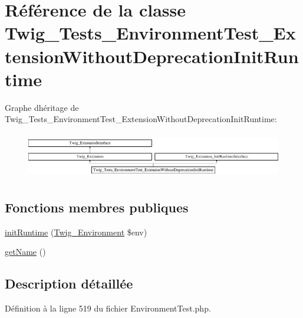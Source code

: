 \hypertarget{class_twig___tests___environment_test___extension_without_deprecation_init_runtime}{}\section{Référence de la classe Twig\+\_\+\+Tests\+\_\+\+Environment\+Test\+\_\+\+Extension\+Without\+Deprecation\+Init\+Runtime}
\label{class_twig___tests___environment_test___extension_without_deprecation_init_runtime}
Graphe d\textquotesingle{}héritage de Twig\+\_\+\+Tests\+\_\+\+Environment\+Test\+\_\+\+Extension\+Without\+Deprecation\+Init\+Runtime\+:\begin{figure}[H]
\begin{center}
\leavevmode
\includegraphics[height=2.033898cm]{class_twig___tests___environment_test___extension_without_deprecation_init_runtime}
\end{center}
\end{figure}
\subsection*{Fonctions membres publiques}
\begin{DoxyCompactItemize}
\item 
\hyperlink{class_twig___tests___environment_test___extension_without_deprecation_init_runtime_a58a853f61d095249f28927c0e40441ff}{init\+Runtime} (\hyperlink{class_twig___environment}{Twig\+\_\+\+Environment} \$env)
\item 
\hyperlink{class_twig___tests___environment_test___extension_without_deprecation_init_runtime_a3d0963e68bb313b163a73f2803c64600}{get\+Name} ()
\end{DoxyCompactItemize}


\subsection{Description détaillée}


Définition à la ligne 519 du fichier Environment\+Test.\+php.



